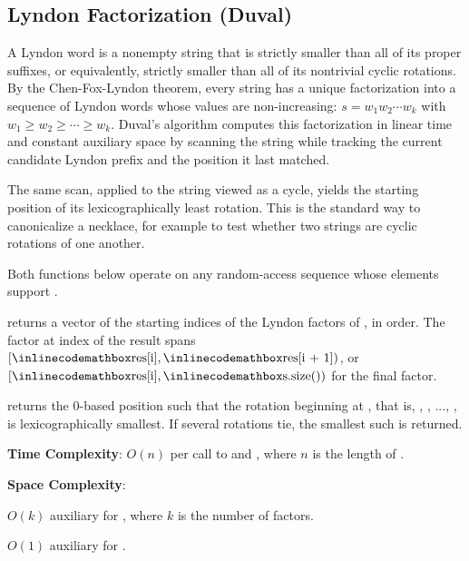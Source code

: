 \subsection{Lyndon Factorization (Duval)}
\label{sec:3.3.6}
A Lyndon word is a nonempty string that is strictly smaller than all of its proper suffixes, or equivalently, strictly smaller than all of its nontrivial cyclic rotations. By the Chen-Fox-Lyndon theorem, every string has a unique factorization into a sequence of Lyndon words whose values are non-increasing: $s = w_1 w_2 \cdots w_k$ with $w_1 \geq w_2 \geq \cdots \geq w_k$. Duval's algorithm computes this factorization in linear time and constant auxiliary space by scanning the string while tracking the current candidate Lyndon prefix and the position it last matched.

The same scan, applied to the string viewed as a cycle, yields the starting position of its lexicographically least rotation. This is the standard way to canonicalize a necklace, for example to test whether two strings are cyclic rotations of one another.

Both functions below operate on any random-access sequence whose elements support .

\begin{compactitem}
  \item {} returns a vector of the starting indices of the Lyndon factors of , in order. The factor at index  of the result spans $[{\inlinecodemath{res[i]}}, {\inlinecodemath{res[i + 1]}})$, or $[{\inlinecodemath{res[i]}}, {\inlinecodemath{s.size()}})$ for the final factor.
  \item {} returns the 0-based position  such that the rotation beginning at , that is, , , ..., , is lexicographically smallest. If several rotations tie, the smallest such  is returned.
\end{compactitem}

\textbf{Time Complexity}: $O(n)$ per call to  and , where $n$ is the length of .

\textbf{Space Complexity}:
\begin{compactitem}
  \item $O(k)$ auxiliary for , where $k$ is the number of factors.
  \item $O(1)$ auxiliary for .
\end{compactitem}

